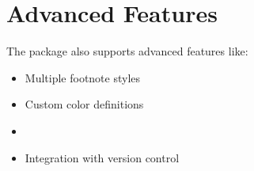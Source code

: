 \documentclass{article}
\begin{document}
\section{Advanced Features}
The package also supports advanced features like:
\begin{itemize}
    \item Multiple footnote styles
    \item Custom color definitions
    \item {}
    \item Integration with version control
\end{itemize}
\end{document}
